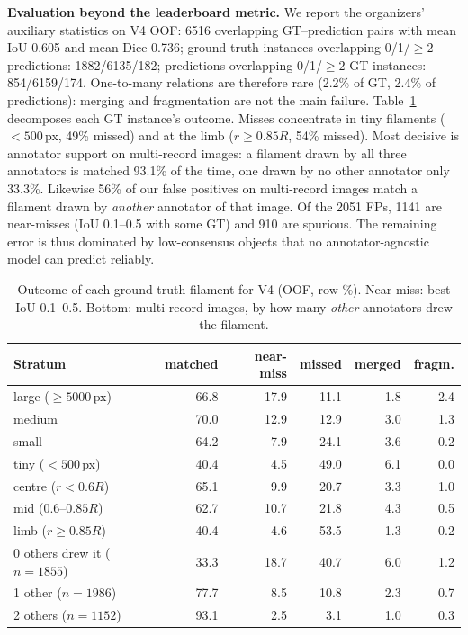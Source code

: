\documentclass[sigconf]{acmart}
\begin{document}
\textbf{Evaluation beyond the leaderboard metric.} We report the organizers' auxiliary statistics on V4 OOF: 6516 overlapping GT--prediction pairs with mean IoU 0.605 and mean Dice 0.736; ground-truth instances overlapping 0/1/${\ge}2$ predictions: 1882/6135/182; predictions overlapping 0/1/${\ge}2$ GT instances: 854/6159/174. One-to-many relations are therefore rare (2.2\% of GT, 2.4\% of predictions): merging and fragmentation are not the main failure. Table~\ref{tab:err} decomposes each GT instance's outcome. Misses concentrate in tiny filaments (${<}500$\,px, 49\% missed) and at the limb ($r{\ge}0.85R$, 54\% missed). Most decisive is annotator support on multi-record images: a filament drawn by all three annotators is matched 93.1\% of the time, one drawn by no other annotator only 33.3\%. Likewise 56\% of our false positives on multi-record images match a filament drawn by \emph{another} annotator of that image. Of the 2051 FPs, 1141 are near-misses (IoU 0.1--0.5 with some GT) and 910 are spurious. The remaining error is thus dominated by low-consensus objects that no annotator-agnostic model can predict reliably.

\begin{table}[t]
\centering\footnotesize
\setlength{\tabcolsep}{3pt}
\caption{Outcome of each ground-truth filament for V4 (OOF, row \%). Near-miss: best IoU 0.1--0.5. Bottom: multi-record images, by how many \emph{other} annotators drew the filament.}
\label{tab:err}
\begin{tabular}{@{}lrrrrr@{}}
\toprule
Stratum & matched & near-miss & missed & merged & fragm.\\
\midrule
large (${\ge}5000$\,px) & 66.8 & 17.9 & 11.1 & 1.8 & 2.4\\
medium & 70.0 & 12.9 & 12.9 & 3.0 & 1.3\\
small & 64.2 & 7.9 & 24.1 & 3.6 & 0.2\\
tiny (${<}500$\,px) & 40.4 & 4.5 & 49.0 & 6.1 & 0.0\\
centre ($r{<}0.6R$) & 65.1 & 9.9 & 20.7 & 3.3 & 1.0\\
mid ($0.6$--$0.85R$) & 62.7 & 10.7 & 21.8 & 4.3 & 0.5\\
limb ($r{\ge}0.85R$) & 40.4 & 4.6 & 53.5 & 1.3 & 0.2\\
\midrule
0 others drew it ($n{=}1855$) & 33.3 & 18.7 & 40.7 & 6.0 & 1.2\\
1 other ($n{=}1986$) & 77.7 & 8.5 & 10.8 & 2.3 & 0.7\\
2 others ($n{=}1152$) & 93.1 & 2.5 & 3.1 & 1.0 & 0.3\\
\bottomrule
\end{tabular}
\end{table}
\end{document}
